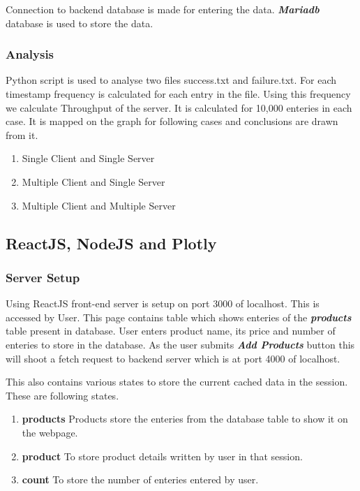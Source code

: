 \documentclass[11pt]{article}
\begin{document}
        Connection to backend database is made for entering the data. \textit{\textbf{Mariadb}}
        database is used to store the data. 
\subsubsection{Analysis}
Python script is used to analyse two files success.txt and failure.txt. For each timestamp frequency is calculated for each entry in the file. Using this frequency we calculate Throughput of the server. 
It is calculated for 10,000 enteries in each case. It is mapped on the graph for following cases and conclusions are drawn from it.
\begin{enumerate}
    \item Single Client and Single Server
    \item Multiple Client and Single Server
    \item Multiple Client and Multiple Server
\end{enumerate}

\subsection{ReactJS, NodeJS and Plotly}
\subsubsection{Server Setup}
Using ReactJS front-end server is setup on port 3000 of localhost. This is accessed by User. 
This page contains table which shows enteries of the \textbf{\textit{products}} table present in database. User enters product name, its price and number of enteries to store in the database. As the user submits \textbf{\textit{Add Products}} button this will shoot a fetch request to backend server which is at port 4000 of localhost. \par

This also contains various states to store the current cached data in the session. These are following states.
\begin{enumerate}
    \item \textbf{products} Products store the enteries from the database table to show it on the webpage.
    \item \textbf{product} To store product details written by user in that session.
    \item \textbf{count} To store the number of enteries entered by user.
\end{enumerate}
\end{document}
